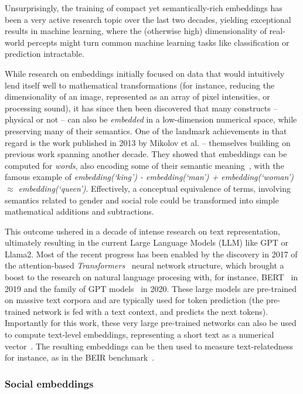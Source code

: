 Unsurprisingly, the training of compact yet semantically-rich embeddings has
been a very active research topic over the last two decades, yielding
exceptional results in machine learning, where the (otherwise high)
dimensionality of real-world percepts might turn common machine learning
tasks like classification or prediction intractable.

While research on embeddings initially focused on data that would intuitively
lend itself well to mathematical transformations (for instance, reducing the
dimensionality of an image, represented as an array of pixel intensities, or
processing sound), it has since then been discovered that many constructs --
physical or not -- can also be \emph{embedded} in a low-dimension numerical
space, while preserving many of their semantics. One of the landmark
achievements in that regard is the work published in 2013 by Mikolov et al. --
themselves building on previous work spanning another decade.  They showed that
embeddings can be computed for \emph{words}, also encoding some of their
semantic meaning~\cite{mikolov2013efficient}, with the famous example of
\emph{embedding(`king') - embedding(`man') + embedding(`woman') $\approx$
embedding(`queen')}. Effectively, a conceptual equivalence of terms, involving
semantics related to gender and social role could be transformed into simple
mathematical additions and subtractions.

This outcome ushered in a decade of intense research on text representation,
ultimately resulting in the current Large Language Models (LLM) like GPT or
Llama2.  Most of the recent progress has been enabled by the discovery in 2017
of the attention-based \emph{Transformers}~\cite{vaswani2017attention} neural
network structure, which brought a boost to the research on natural language
procesing with, for instance, BERT~\cite{devlin2019bert} in 2019 and the family
of GPT models~\cite{wolf2020transformers} in 2020.  These large models
are pre-trained on massive text corpora and are typically used for token
prediction (the pre-trained network is fed with a text context, and predicts the
next tokens).  Importantly for this work, these very large pre-trained networks
can also be used to compute text-level embeddings, representing a short text as
a numerical vector~\cite{reimers2019sentencebert,muennighoff2022sgpt}. The
resulting embeddings can be then used to measure text-relatedness for instance,
as in the BEIR benchmark~\cite{thakur2021beir}.

\subsubsection{Social embeddings}


